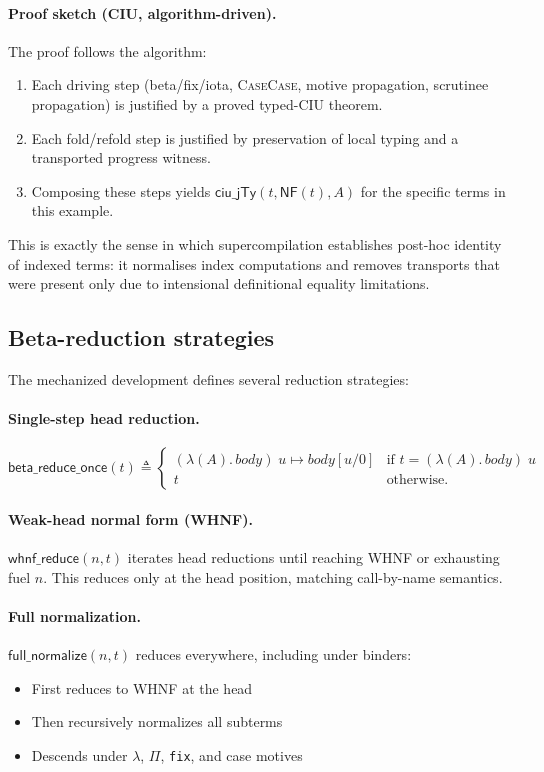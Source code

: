 \paragraph{Proof sketch (CIU, algorithm-driven).}
The proof follows the algorithm:
\begin{enumerate}
\item Each driving step (beta/fix/iota, \textsc{CaseCase}, motive propagation, scrutinee propagation) is justified by a proved typed-CIU theorem.
\item Each fold/refold step is justified by preservation of local typing and a transported progress witness.
\item Composing these steps yields \(\mathsf{ciu\_jTy}(t,\mathsf{NF}(t),A)\) for the specific terms in this example.
\end{enumerate}
This is exactly the sense in which supercompilation establishes post-hoc identity of indexed terms: it normalises index computations and removes transports that were present only due to intensional definitional equality limitations.

\subsection{Beta-reduction strategies}

The mechanized development defines several reduction strategies:

\paragraph{Single-step head reduction.}
\[
\mathsf{beta\_reduce\_once}(t) \triangleq
\begin{cases}
  (\lambda(A).\,\mathit{body})\;u \mapsto \mathit{body}[u/0] &\text{if } t = (\lambda(A).\,\mathit{body})\;u \\
  t &\text{otherwise.}
\end{cases}
\]

\paragraph{Weak-head normal form (WHNF).}
\(\mathsf{whnf\_reduce}(n, t)\) iterates head reductions until reaching WHNF or exhausting fuel \(n\).
This reduces only at the head position, matching call-by-name semantics.

\paragraph{Full normalization.}
\(\mathsf{full\_normalize}(n, t)\) reduces everywhere, including under binders:
\begin{itemize}
\item First reduces to WHNF at the head
\item Then recursively normalizes all subterms
\item Descends under \(\lambda\), \(\Pi\), \texttt{fix}, and case motives
\end{itemize}


